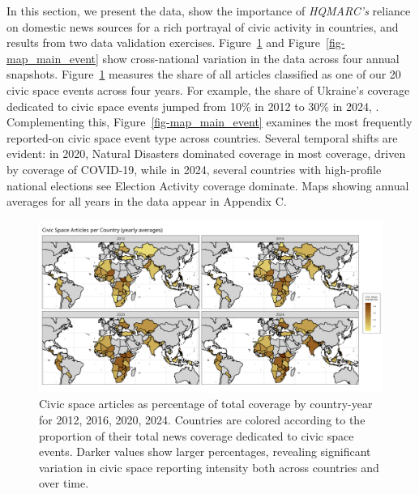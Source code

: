 \documentclass[
  letterpaper,
  DIV=11,
  numbers=noendperiod]{scrartcl}
\begin{document}
In this section, we present the data, show the importance of
\emph{HQMARC's} reliance on domestic news sources for a rich portrayal
of civic activity in countries, and results from two data validation
exercises. Figure~\ref{fig-map_cs_p_main} and
Figure~\ref{fig-map_main_event} show cross-national variation in the
data across four annual snapshots. Figure~\ref{fig-map_cs_p_main}
measures the share of all articles classified as one of our 20 civic
space events across four years. For example, the share of Ukraine's
coverage dedicated to civic space events jumped from 10\% in 2012 to
30\% in 2024, . Complementing this, Figure~\ref{fig-map_main_event}
examines the most frequently reported-on civic space event type across
countries. Several temporal shifts are evident: in 2020, Natural
Disasters dominated coverage in most coverage, driven by coverage of
COVID-19, while in 2024, several countries with high-profile national
elections see Election Activity coverage dominate. Maps showing annual
averages for all years in the data appear in Appendix C.

\begin{figure}

{\centering \includegraphics{descriptive_maps/figures/civic_space_percentage_paper.png}

}

\caption{\label{fig-map_cs_p_main}Civic space articles as percentage of
total coverage by country-year for 2012, 2016, 2020, 2024. Countries are
colored according to the proportion of their total news coverage
dedicated to civic space events. Darker values show larger percentages,
revealing significant variation in civic space reporting intensity both
across countries and over time.}

\end{figure}
\end{document}
